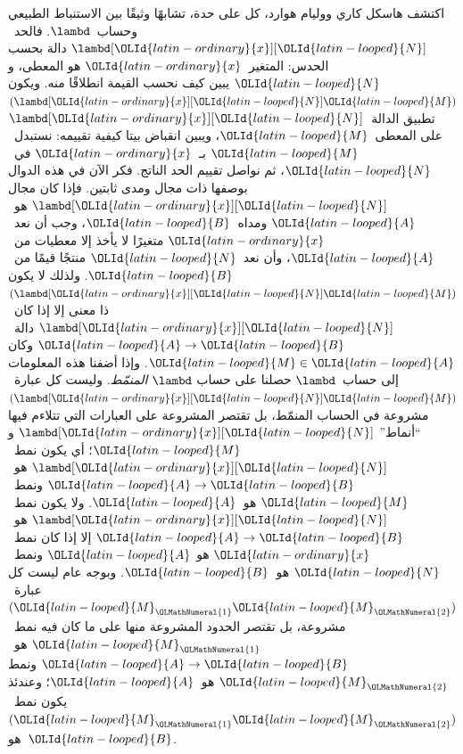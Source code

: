 \documentclass[../../../include/open-logic-section]{subfiles}
\begin{document}
اكتشف هاسكل كاري ووليام هوارد، كل على حدة، تشابهًا وثيقًا بين الاستنباط
الطبيعي وحساب~$\lambd$. فالحد~$\lambd[\OLId{latin-ordinary}{x}][\OLId{latin-looped}{N}]$ دالة بحسب الحدس: المتغير~$\OLId{latin-ordinary}{x}$
هو المعطى، و$\OLId{latin-looped}{N}$ يبين كيف نحسب القيمة انطلاقًا منه. ويكون
$(\lambd[\OLId{latin-ordinary}{x}][\OLId{latin-looped}{N}]\OLId{latin-looped}{M})$ تطبيق الدالة~$\lambd[\OLId{latin-ordinary}{x}][\OLId{latin-looped}{N}]$ على المعطى~$\OLId{latin-looped}{M}$، ويبين
انقباض بيتا كيفية تقييمه: نستبدل~$\OLId{latin-looped}{M}$ بـ~$\OLId{latin-ordinary}{x}$ في~$\OLId{latin-looped}{N}$، ثم نواصل تقييم الحد
الناتج. فكر الآن في هذه الدوال بوصفها ذات مجال ومدى ثابتين. فإذا كان مجال
$\lambd[\OLId{latin-ordinary}{x}][\OLId{latin-looped}{N}]$ هو~$\OLId{latin-looped}{A}$ ومداه~$\OLId{latin-looped}{B}$، وجب أن نعد~$\OLId{latin-ordinary}{x}$ متغيرًا لا يأخذ إلا
معطيات من~$\OLId{latin-looped}{A}$، وأن نعد~$\OLId{latin-looped}{N}$ منتجًا قيمًا من~$\OLId{latin-looped}{B}$. ولذلك لا يكون
$(\lambd[\OLId{latin-ordinary}{x}][\OLId{latin-looped}{N}]\OLId{latin-looped}{M})$ ذا معنى إلا إذا كان~$\lambd[\OLId{latin-ordinary}{x}][\OLId{latin-looped}{N}]$ دالة~$\OLId{latin-looped}{A}\to \OLId{latin-looped}{B}$ وكان
$\OLId{latin-looped}{M}\in \OLId{latin-looped}{A}$. وإذا أضفنا هذه المعلومات إلى حساب~$\lambd$ حصلنا على حساب
$\lambd$ \emph{المنمّط}. وليست كل عبارة~$(\lambd[\OLId{latin-ordinary}{x}][\OLId{latin-looped}{N}]\OLId{latin-looped}{M})$ مشروعة في
الحساب المنمّط، بل تقتصر المشروعة على العبارات التي تتلاءم فيها ``أنماط''
$\lambd[\OLId{latin-ordinary}{x}][\OLId{latin-looped}{N}]$ و$\OLId{latin-looped}{M}$؛ أي يكون نمط~$\lambd[\OLId{latin-ordinary}{x}][\OLId{latin-looped}{N}]$ هو~$\OLId{latin-looped}{A}\to \OLId{latin-looped}{B}$ ونمط~$\OLId{latin-looped}{M}$
هو~$\OLId{latin-looped}{A}$. ولا يكون نمط~$\lambd[\OLId{latin-ordinary}{x}][\OLId{latin-looped}{N}]$ هو~$\OLId{latin-looped}{A}\to \OLId{latin-looped}{B}$ إلا إذا كان نمط~$\OLId{latin-ordinary}{x}$ هو
$\OLId{latin-looped}{A}$ ونمط~$\OLId{latin-looped}{N}$ هو~$\OLId{latin-looped}{B}$. وبوجه عام ليست كل عبارة~$(\OLId{latin-looped}{M}_\OLMathNumeral{1}\OLId{latin-looped}{M}_\OLMathNumeral{2})$ مشروعة، بل
تقتصر الحدود المشروعة منها على ما كان فيه نمط~$\OLId{latin-looped}{M}_\OLMathNumeral{1}$ هو~$\OLId{latin-looped}{A}\to \OLId{latin-looped}{B}$ ونمط
$\OLId{latin-looped}{M}_\OLMathNumeral{2}$ هو~$\OLId{latin-looped}{A}$؛ وعندئذ يكون نمط~$(\OLId{latin-looped}{M}_\OLMathNumeral{1}\OLId{latin-looped}{M}_\OLMathNumeral{2})$ هو~$\OLId{latin-looped}{B}$.
\end{document}
